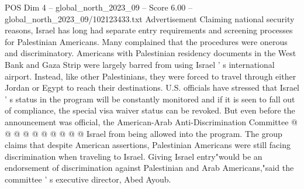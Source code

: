 \begin{textsample}{POS Dim 4 – global\_north\_2023\_09 – Score 6.00 – global\_north\_2023\_09/102123433.txt}
Advertisement Claiming national security reasons, Israel has long had separate entry requirements and screening processes for Palestinian Americans.
Many complained that the procedures were onerous and discriminatory.
Americans with Palestinian residency documents in the West Bank and Gaza Strip were largely barred from using Israel ' s international airport.
Instead, like other Palestinians, they were forced to travel through either Jordan or Egypt to reach their destinations.
U.S. officials have stressed that Israel ' s status in the program will be constantly monitored and if it is seen to fall out of compliance, the special visa waiver status can be revoked.
But even before the announcement was official, the American-Arab Anti-Discrimination Committee @ @ @ @ @ @ @ @ @ @ Israel from being allowed into the program.
The group claims that despite American assertions, Palestinian Americans were still facing discrimination when traveling to Israel.
Giving Israel entry"would be an endorsement of discrimination against Palestinian and Arab Americans,"said the committee ' s executive director, Abed Ayoub.

\end{textsample}

